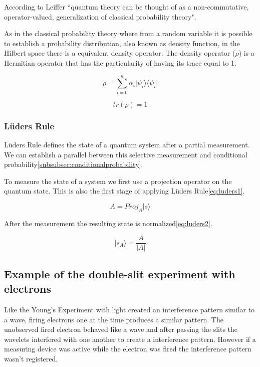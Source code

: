 According to Leiffer\cite{Leifer2008} ``quantum theory can be thought of as a non-commutative, operator-valued, generalization of classical probability theory". 


As in the classical probability theory where from a random variable it is possible to establish a probability distribution, also known as density function, in the Hilbert space there is a equivalent density operator.
The density operator ($\rho$) is a Hermitian operator that has the particularity of having its trace equal to 1\cite{VanRijsbergen2004}.

\begin{equation}
\label{eq_trace1}
\rho = \sum_{i=0}^{n} \alpha_{i} \vert\psi_{i}\rangle\langle\psi_{i}\vert
\end{equation} 

\begin{equation}
\label{eq_trace1}
tr( \rho ) = 1
\end{equation}


\subsubsection{L\"{u}ders Rule}
\label{subsubsec:ludersrule}
L\"{u}ders Rule defines the state of a quantum system after a partial measurement. We can establish a parallel between this selective measurement and conditional probability\ref{subsubsec:conditionalprobability}\cite{Busch2009}.

To measure the state of a system we first use a projection operator on the quantum state. This is also the first stage of applying L\"{u}ders Rule\ref{eq:luders1}.

\begin{equation}
\label{eq:luders1}
A=Proj_{A}\vert s\rangle
\end{equation}

After the measurement the resulting state is normalized\ref{eq:luders2}.

\begin{equation}
\label{eq:luders2}
\vert s_{A}\rangle=\frac{A}{\vert A\vert}
\end{equation}

\subsection{Example of the double-slit experiment with electrons}
\label{subsubsec:double_slit}
 Like the Young's Experiment with light created an interference pattern similar to a wave, firing electrons one at the time produces a similar pattern. The unobserved fired electron behaved like a wave and after passing the slits the wavelets interfered with one another to create a interference pattern. However if a measuring device was active while the electron was fired the interference pattern wasn't registered. 

